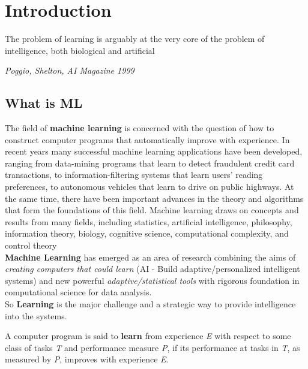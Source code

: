\documentclass[../main.tex]{subfiles}
\begin{document}
\section{Introduction}
\epigraph{The problem of learning is arguably at the very core of the problem of intelligence, both biological and artificial}{\textit{Poggio, Shelton, AI Magazine 1999}}
\subsection{What is ML}
 The field of \textbf{machine learning} is concerned with the question of how to construct computer programs that automatically improve with experience. In recent years many successful machine learning applications have been developed, ranging from data-mining programs that learn to detect fraudulent credit card transactions, to information-filtering systems that learn users' reading preferences, to autonomous vehicles that learn to drive on public highways. At the same time, there have been important advances in the theory and algorithms that form the foundations of this field. Machine learning draws on concepts and results from many fields, including statistics, artificial intelligence, philosophy, information theory, biology, cognitive science, computational complexity, and control theory\\
 
 \textbf{Machine Learning} has emerged as an area of research combining the aims of \textit{creating computers that could learn} (AI - Build adaptive/personalized intelligent systems) and new powerful \textit{adaptive/statistical tools} with rigorous foundation in computational science for data analysis.\\

So \textbf{Learning} is the major challenge and a strategic way to provide intelligence into the systems.

\theoremstyle{definition}
\begin{definition}
A computer program is said to \textbf{learn} from experience \textit{E} with respect to some class of tasks \textit{T} and performance measure \textit{P}, if its performance at tasks in \textit{T}, as measured by \textit{P}, improves with experience \textit{E}.
\end{definition}
\end{document}
